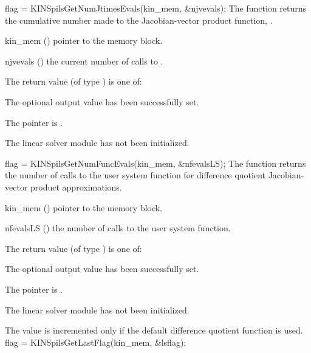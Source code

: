 {}
{
  flag = KINSpilsGetNumJtimesEvals(kin\_mem, \&njvevals);
}
{
  The function  returns the
  cumulative number made to the Jacobian-vector product function,
  .
}
{
  \begin{args}
  \item[kin\_mem] ()
    pointer to the {\kinsol} memory block.
  \item[njvevals] ()
    the current number of calls to .
  \end{args}
}
{
  The return value  (of type ) is one of:
  \begin{args}
  \item[\Id{KINSPILS\_SUCCESS}] 
    The optional output value has been successfully set.
  \item[\Id{KINSPILS\_MEM\_NULL}]
    The  pointer is .
  \item[\Id{KINSPILS\_LMEM\_NULL}]
    The linear solver module has not been initialized.
  \end{args}
}
{}
{
  flag = KINSpilsGetNumFuncEvals(kin\_mem, \&nfevalsLS);
}
{
  The function  returns the
  number of calls to the user system function for
  difference quotient Jacobian-vector product approximations.
}
{
  \begin{args}
  \item[kin\_mem] ()
    pointer to the {\kinsol} memory block.
  \item[nfevalsLS] ()
    the number of calls to the user system function.
  \end{args}
}
{
  The return value  (of type ) is one of:
  \begin{args}
  \item[\Id{KINSPILS\_SUCCESS}] 
    The optional output value has been successfully set.
  \item[\Id{KINSPILS\_MEM\_NULL}]
    The  pointer is .
  \item[\Id{KINSPILS\_LMEM\_NULL}]
    The linear solver module has not been initialized.
  \end{args}
}
{
  The value  is incremented only if the default 
   difference quotient function is used.
}
{
  flag = KINSpilsGetLastFlag(kin\_mem, \&lsflag);
}
